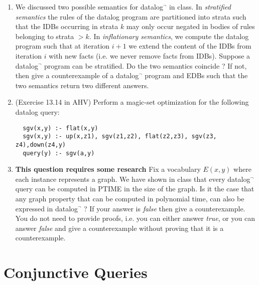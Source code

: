\documentclass[12pt]{article}
\newcounter{query}
\begin{document}
\begin{enumerate}
\item We discussed two possible semantics for datalog$^\neg$ in class.
  In {\em stratified semantics} the rules of the datalog program are
  partitioned into strata such that the IDBs occurring in strata $k$
  may only occur negated in bodies of rules belonging to strata $>k$.
  In {\em inflationary semantics}, we compute the datalog program such
  that at iteration $i+1$ we extend the content of the IDBs from
  iteration $i$ with new facts (i.e. we never remove facts from IDBs).
  Suppose a datalog$^\neg$ program can be stratified.  Do the two
  semantics coincide ?  If not, then give a counterexample of a
  datalog$^\neg$ program and EDBs such that the two semantics return
  two different answers.
\item (Exercise 13.14 in AHV) Perform a magic-set optimization for the
  following datalog query:
\begin{verbatim}
  sgv(x,y) :- flat(x,y)
  sgv(x,y) :- up(x,z1), sgv(z1,z2), flat(z2,z3), sgv(z3, z4),down(z4,y)
  query(y) :- sgv(a,y)
\end{verbatim}
\item {\bf This question requires some research} Fix a vocabulary
  $E(x,y)$ where each instance represents a graph.  We have shown in
  class that every datalog$^\neg$ query can be computed in PTIME in
  the size of the graph.  Is it the case that any graph property that
  can be computed in polynomial time, can also be expressed in
  datalog$^\neg$ ? If your answer is {\em false} then give a
  counterexample.  You do not need to provide proofs, i.e. you can
  either answer {\em true}, or you can answer {\em false} and give a
  counterexample without proving that it is a counterexample.
  \end{enumerate}


\section{Conjunctive Queries}

 
\end{document}
